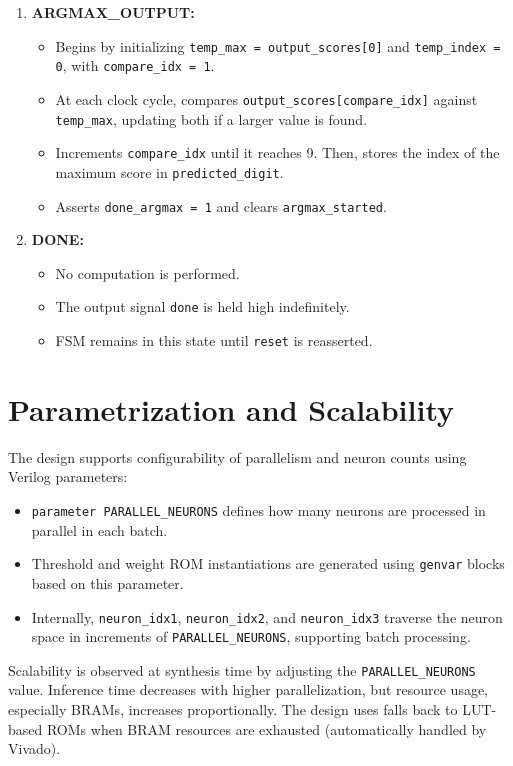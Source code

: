 \documentclass[a4paper,12pt]{report}
\begin{document}
\begin{enumerate}
    \item \textbf{ARGMAX\_OUTPUT:}
    \begin{itemize}
        \item Begins by initializing \texttt{temp\_max = output\_scores[0]} and \texttt{temp\_index = 0}, with \texttt{compare\_idx = 1}.
        \item At each clock cycle, compares \texttt{output\_scores[compare\_idx]} against \newline \texttt{temp\_max}, updating both if a larger value is found.
        \item Increments \texttt{compare\_idx} until it reaches 9. Then, stores the index of the maximum score in \texttt{predicted\_digit}.
        \item Asserts \texttt{done\_argmax = 1} and clears \texttt{argmax\_started}.
    \end{itemize}

    \item \textbf{DONE:}
    \begin{itemize}
        \item No computation is performed.
        \item The output signal \texttt{done} is held high indefinitely.
        \item FSM remains in this state until \texttt{reset} is reasserted.
    \end{itemize}
\end{enumerate}


\section{Parametrization and Scalability}
The design supports configurability of parallelism and neuron counts using Verilog parameters:
\begin{itemize}
    \item \texttt{parameter PARALLEL\_NEURONS} defines how many neurons are processed in parallel in each batch.
    \item Threshold and weight ROM instantiations are generated using \texttt{genvar} blocks based on this parameter.
    \item Internally, \texttt{neuron\_idx1}, \texttt{neuron\_idx2}, and \texttt{neuron\_idx3} traverse the neuron space in increments of \texttt{PARALLEL\_NEURONS}, supporting batch processing.
\end{itemize}
Scalability is observed at synthesis time by adjusting the \texttt{PARALLEL\_NEURONS} value. Inference time decreases with higher parallelization, but resource usage, especially BRAMs, increases proportionally. The design uses falls back to LUT-based ROMs when BRAM resources are exhausted (automatically handled by Vivado).
\end{document}
